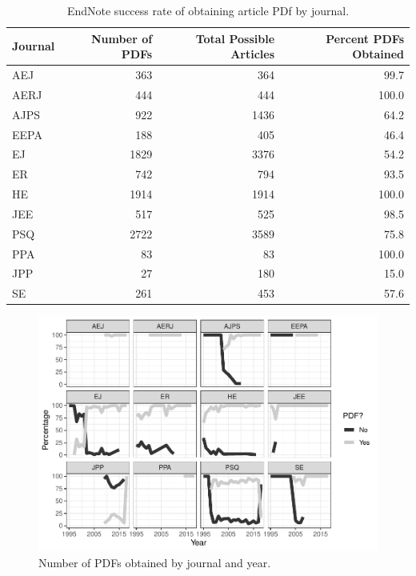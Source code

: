 \documentclass[english,,man]{apa6}
\begin{document}
\begin{table}[!h]

\caption{\label{tab:setup}EndNote success rate of obtaining article PDf by journal.}
\centering
\begin{tabular}[t]{lrrr}
\toprule
Journal & Number of PDFs & Total Possible Articles & Percent PDFs Obtained\\
\midrule
AEJ & 363 & 364 & 99.7\\
AERJ & 444 & 444 & 100.0\\
AJPS & 922 & 1436 & 64.2\\
EEPA & 188 & 405 & 46.4\\
EJ & 1829 & 3376 & 54.2\\
\addlinespace
ER & 742 & 794 & 93.5\\
HE & 1914 & 1914 & 100.0\\
JEE & 517 & 525 & 98.5\\
PSQ & 2722 & 3589 & 75.8\\
PPA & 83 & 83 & 100.0\\
\addlinespace
JPP & 27 & 180 & 15.0\\
SE & 261 & 453 & 57.6\\
\bottomrule
\end{tabular}
\end{table}

\begin{figure}
\centering
\includegraphics{software_files/figure-latex/pdf-time-1.pdf}
\caption{\label{fig:pdf-time}Number of PDFs obtained by journal and year.}
\end{figure}
\end{document}

